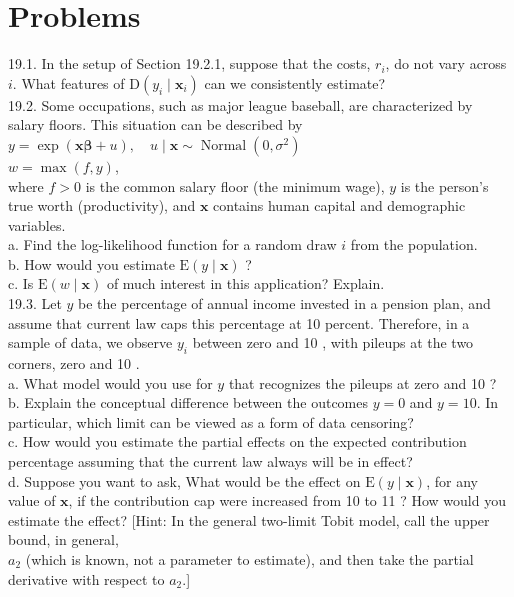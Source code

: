 \documentclass[10pt]{article}
\begin{document}
\section*{Problems}
19.1. In the setup of Section 19.2.1, suppose that the costs, $r_{i}$, do not vary across $i$. What features of $\mathrm{D}\left(y_{i} \mid \mathbf{x}_{i}\right)$ can we consistently estimate?\\
19.2. Some occupations, such as major league baseball, are characterized by salary floors. This situation can be described by\\
$y=\exp (\mathbf{x} \boldsymbol{\beta}+u), \quad u \mid \mathbf{x} \sim \operatorname{Normal}\left(0, \sigma^{2}\right)$\\
$w=\max (f, y)$,\\
where $f>0$ is the common salary floor (the minimum wage), $y$ is the person's true worth (productivity), and $\mathbf{x}$ contains human capital and demographic variables.\\
a. Find the log-likelihood function for a random draw $i$ from the population.\\
b. How would you estimate $\mathrm{E}(y \mid \mathbf{x})$ ?\\
c. Is $\mathrm{E}(w \mid \mathbf{x})$ of much interest in this application? Explain.\\
19.3. Let $y$ be the percentage of annual income invested in a pension plan, and assume that current law caps this percentage at 10 percent. Therefore, in a sample of data, we observe $y_{i}$ between zero and 10 , with pileups at the two corners, zero and 10 .\\
a. What model would you use for $y$ that recognizes the pileups at zero and 10 ?\\
b. Explain the conceptual difference between the outcomes $y=0$ and $y=10$. In particular, which limit can be viewed as a form of data censoring?\\
c. How would you estimate the partial effects on the expected contribution percentage assuming that the current law always will be in effect?\\
d. Suppose you want to ask, What would be the effect on $\mathrm{E}(y \mid \mathbf{x})$, for any value of $\mathbf{x}$, if the contribution cap were increased from 10 to 11 ? How would you estimate the effect? [Hint: In the general two-limit Tobit model, call the upper bound, in general,\\
$a_{2}$ (which is known, not a parameter to estimate), and then take the partial derivative with respect to $a_{2}$.]\\
\end{document}
